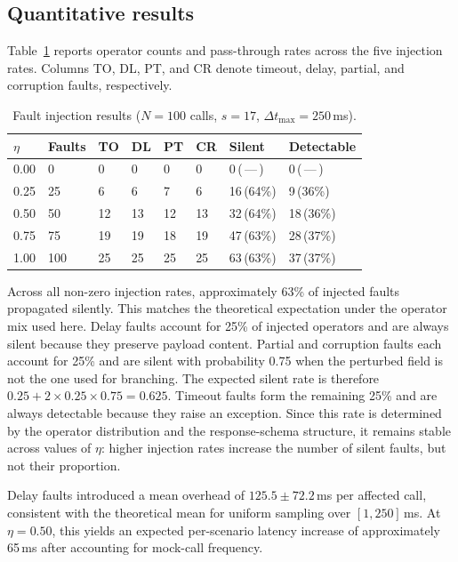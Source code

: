 \documentclass[3p,times,procedia]{elsarticle}
\begin{document}
\subsection{Quantitative results}
\label{subsec:quantitative}

Table~\ref{tab:faults} reports operator counts and pass-through rates across the five injection rates. Columns TO, DL, PT, and CR denote timeout, delay, partial, and corruption faults, respectively.

\begin{table}[h]
\caption{Fault injection results ($N=100$ calls, $s=17$, $\Delta t_{\max}=250$\,ms).}
\label{tab:faults}
\begin{tabular*}{\hsize}{@{\extracolsep{\fill}}llllllll@{}}
\toprule
$\eta$ & Faults & TO & DL & PT & CR & Silent & Detectable \\
\midrule
0.00 & 0   & 0  & 0  & 0  & 0  & 0\,(\,---\,) & 0\,(\,---\,) \\
0.25 & 25  & 6  & 6  & 7  & 6  & 16\,(64\%) & 9\,(36\%) \\
0.50 & 50  & 12 & 13 & 12 & 13 & 32\,(64\%) & 18\,(36\%) \\
0.75 & 75  & 19 & 19 & 18 & 19 & 47\,(63\%) & 28\,(37\%) \\
1.00 & 100 & 25 & 25 & 25 & 25 & 63\,(63\%) & 37\,(37\%) \\
\bottomrule
\end{tabular*}
\end{table}

Across all non-zero injection rates, approximately 63\% of injected faults propagated silently. This matches the theoretical expectation under the operator mix used here. Delay faults account for 25\% of injected operators and are always silent because they preserve payload content. Partial and corruption faults each account for 25\% and are silent with probability 0.75 when the perturbed field is not the one used for branching. The expected silent rate is therefore $0.25 + 2 \times 0.25 \times 0.75 = 0.625$. Timeout faults form the remaining 25\% and are always detectable because they raise an exception. Since this rate is determined by the operator distribution and the response-schema structure, it remains stable across values of $\eta$: higher injection rates increase the number of silent faults, but not their proportion.

Delay faults introduced a mean overhead of $125.5 \pm 72.2$\,ms per affected call, consistent with the theoretical mean for uniform sampling over $[1,250]$\,ms. At $\eta = 0.50$, this yields an expected per-scenario latency increase of approximately 65\,ms after accounting for mock-call frequency.
\end{document}
